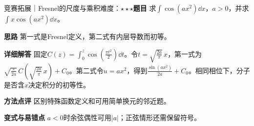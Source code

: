 \begin{example}{竞赛拓展｜Fresnel的尺度与乘积}{难度：$\star\star\star$}\label{deep:ex:integral_special_deep:fresnelprimitive}\textbf{题目} 求$\int\cos(ax^2)\dd x$，$a>0$，并求$\int x\cos(ax^2)\dd x$。\par\textbf{思路} 第一式是Fresnel定义，第二式有内层导数而初等。\par\textbf{详细解答} 固定$C(z)=\int_0^z\cos(\frac{\pi t^2}{2})\dd t$。令$t=\sqrt{\frac{2a}{\pi}}\,x$，第一式为$\sqrt{\frac{\pi}{2a}}\,C(\sqrt{\frac{2a}{\pi}}\,x)+C_0$。第二式令$u=ax^2$，得到$\frac{\sin(ax^2)}{2a}+C_0$。相同相位下，分子是否含$x$决定积分的初等性。\par\textbf{方法点评} 区别特殊函数定义和可用简单换元的邻近题。\par\textbf{变式与易错点} $a<0$时余弦偶性可用$|a|$；正弦情形还需保留符号。\end{example}
